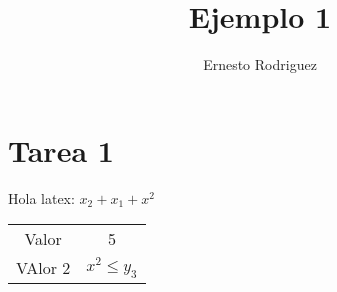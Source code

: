 \documentclass{article}
\author{Ernesto Rodriguez}
\title{Ejemplo 1}
\begin{document}
\maketitle
\section{Tarea 1}
Hola latex: $x_2 + x_1 + x^2$
\begin{tabular}{|c|c|}
    \hline
    Valor & 5 \\
    VAlor 2 & $x^2 \leq y_3$ \\
    \hline
\end{tabular}
\end{document}
